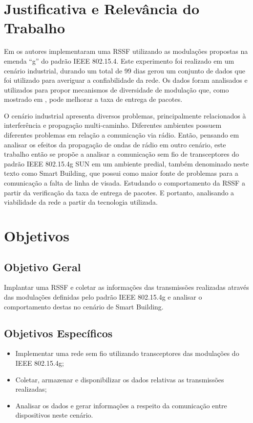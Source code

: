 \section{Justificativa e Relevância do Trabalho}
\label{sec:justificativa}
Em \cite{tuset2020dataset} os autores implementaram uma RSSF utilizando as modulações propostas na emenda ``g'' do padrão IEEE 802.15.4. Este experimento foi realizado em um cenário industrial, durando um total de 99 dias gerou um conjunto de dados que foi utilizado para averiguar a confiabilidade da rede. Os dados foram analisados e utilizados para propor mecanismos de diversidade de modulação que, como mostrado em \cite{gomes2020improving}, pode melhorar a taxa de entrega de pacotes.

O cenário industrial apresenta diversos problemas, principalmente relacionados à interferência e propagação multi-caminho. Diferentes ambientes possuem diferentes problemas em relação a comunicação via rádio. Então, pensando em analisar os efeitos da propagação de ondas de rádio em outro cenário, este trabalho então se propõe a analisar a comunicação sem fio de transceptores do padrão IEEE 802.15.4g SUN em um ambiente predial, também denominado neste texto como Smart Building, que possui como maior fonte de problemas para a comunicação a falta de linha de visada. Estudando o comportamento da RSSF a partir da verificação da taxa de entrega de pacotes. E portanto, analisando a viabilidade da rede a partir da tecnologia utilizada.

\section{Objetivos}
\label{sec:objetivos}

\subsection{Objetivo Geral}
\label{subsec:objGeral}
Implantar uma RSSF e coletar as informações das transmissões realizadas através das modulações definidas pelo padrão IEEE 802.15.4g e analisar o comportamento destas no cenário de Smart Building.


\subsection{Objetivos Específicos}
\label{subsec:objespecificos}
\begin{itemize}
    \item Implementar uma rede sem fio utilizando transceptores das modulações do IEEE 802.15.4g;
    \item Coletar, armazenar e disponibilizar os dados relativas as transmissões realizadas;
    \item Analisar os dados e gerar informações a respeito da comunicação entre dispositivos neste cenário.
\end{itemize}


